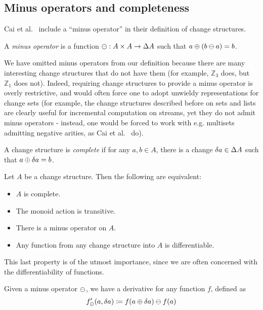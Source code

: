 \subsection{Minus operators and completeness}

Cai et al.~\cite{cai2014changes} include a ``minus operator'' in their definition of change structures. 

\begin{defn}
  A \textit{minus operator} is a function $\ominus: A \times A \rightarrow \Delta A$ such that $a \oplus (b \ominus a) = b$.
\end{defn}

We have omitted minus operators from our definition because
there are many interesting change structures that do not have them (for example,
$\mathbb{Z}_3$ does, but $\mathbb{Z}_1$ does not). Indeed, requiring change structures to provide
a minus operator is overly restrictive, and would often force one to adopt unwieldy representations
for change sets (for example, the change structures described before on sets and lists are clearly
useful for incremental computation on streams, yet they do not admit minus operators - instead, one would
be forced to work with e.g. multisets admitting negative arities, as Cai et al.~\cite{cai2014changes} do).

\begin{defn}[Completeness]
  A change structure is \textit{complete} if for any $a, b \in A$, there is
  a change $\delta a \in \Delta A$ such that $a \oplus \delta a = b$.
\end{defn}

\begin{prop}
  Let $A$ be a change structure. Then the following are equivalent:
  \begin{itemize}
    \item $A$ is complete.
    \item The monoid action is transitive.
    \item There is a minus operator on $A$.
    \item Any function from any change structure into $A$ is differentiable.
  \end{itemize}
\end{prop}

This last property is of the utmost importance, since we are often concerned with the differentiability
of functions.

\begin{defn}
  Given a minus operator $\ominus$, we have a derivative for any function $f$,
  defined as
  $$f'_\ominus(a, \delta a) \coloneqq f(a \oplus \delta a) \ominus f(a)$$
\end{defn}

